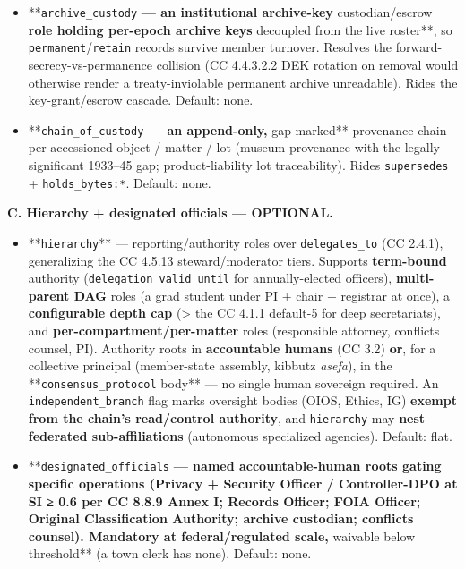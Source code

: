 \documentclass[11pt]{article}
\begin{document}
\begin{itemize}
\item **\texttt{archive\_custody}\textbf{ — an institutional archive-key }custodian/escrow\textbf{ role holding per-epoch archive keys }decoupled from the live roster**, so \texttt{permanent}/\texttt{retain} records survive member turnover. Resolves the forward-secrecy-vs-permanence collision (CC 4.4.3.2.2 DEK rotation on removal would otherwise render a treaty-inviolable permanent archive unreadable). Rides the key-grant/escrow cascade. Default: none.
\item **\texttt{chain\_of\_custody}\textbf{ — an append-only, }gap-marked** provenance chain per accessioned object / matter / lot (museum provenance with the legally-significant 1933–45 gap; product-liability lot traceability). Rides \texttt{supersedes} + \texttt{holds\_bytes:*}. Default: none.
\end{itemize}


\textbf{C. Hierarchy + designated officials — OPTIONAL.}


\begin{itemize}\setlength\itemsep{0pt}
\item **\texttt{hierarchy}** — reporting/authority roles over \texttt{delegates\_to} (CC 2.4.1), generalizing the CC 4.5.13 steward/moderator tiers. Supports \textbf{term-bound} authority (\texttt{delegation\_valid\_until} for annually-elected officers), \textbf{multi-parent DAG} roles (a grad student under PI + chair + registrar at once), a \textbf{configurable depth cap} (> the CC 4.1.1 default-5 for deep secretariats), and \textbf{per-compartment/per-matter} roles (responsible attorney, conflicts counsel, PI). Authority roots in \textbf{accountable humans} (CC 3.2) \textbf{or}, for a collective principal (member-state assembly, kibbutz \textit{asefa}), in the **\texttt{consensus\_protocol} body** — no single human sovereign required. An \texttt{independent\_branch} flag marks oversight bodies (OIOS, Ethics, IG) \textbf{exempt from the chain's read/control authority}, and \texttt{hierarchy} may \textbf{nest federated sub-affiliations} (autonomous specialized agencies). Default: flat.
\item **\texttt{designated\_officials}\textbf{ — named accountable-human roots gating specific operations (Privacy + Security Officer / Controller-DPO at SI ≥ 0.6 per CC 8.8.9 Annex I; Records Officer; FOIA Officer; Original Classification Authority; archive custodian; conflicts counsel). Mandatory at federal/regulated scale, }waivable below threshold** (a town clerk has none). Default: none.
\end{itemize}
\end{document}
